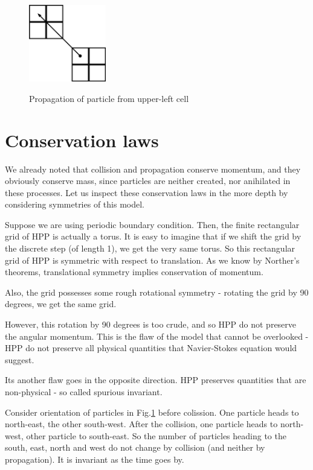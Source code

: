 \begin{figure} [h]
 \centering
 \includegraphics[width=0.3\textwidth]{./img/propleft}
 \label{hpp-colision}
 \caption{Propagation of particle from upper-left cell}
\end{figure}

\bigskip

\section{Conservation laws}

We already noted that collision and propagation conserve momentum, and they obviously conserve mass, since particles are neither created, nor anihilated in these processes. 
Let us inspect these conservation laws in the more depth by considering symmetries of this model.

Suppose we are using periodic boundary condition. Then, the finite rectangular grid of HPP is actually a torus. It is easy to imagine that if we shift the grid by the discrete step (of length 1), we get the very same torus.
So this rectangular grid of HPP is symmetric with respect to translation.
As we know by Norther's theorems, translational symmetry implies conservation of momentum.

\bigskip

Also, the grid possesses some rough rotational symmetry - rotating the grid by 90 degrees, we get the same grid.

However, this rotation by 90 degrees is too crude, and so HPP do not preserve the angular momentum. This is the flaw of the model that cannot be overlooked - HPP do not preserve all physical quantities that Navier-Stokes equation would suggest.

Its another flaw goes in the opposite direction. HPP preserves quantities that are non-physical - so called spurious invariant.

Consider orientation of particles in Fig.\ref{hpp-colision} before colission.
One particle heads to north-east, the other south-west.
After the collision, one particle heads to north-west, other particle to south-east.
So the number of particles heading to the south, east, north and west do not change by collision (and neither by propagation). It is invariant as the time goes by.

